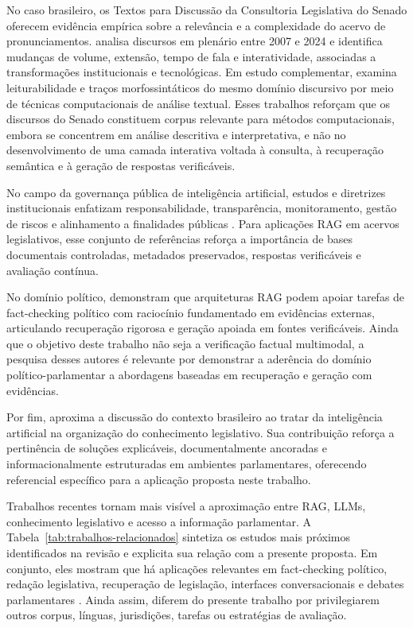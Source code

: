No caso brasileiro, os Textos para Discussão da Consultoria Legislativa do Senado oferecem evidência empírica sobre a relevância e a complexidade do acervo de pronunciamentos. \textcite{blanco2025plenarioPalanqueEstudio} analisa discursos em plenário entre 2007 e 2024 e identifica mudanças de volume, extensão, tempo de fala e interatividade, associadas a transformações institucionais e tecnológicas. Em estudo complementar, \textcite{blanco2026letrasGraudas} examina leiturabilidade e traços morfossintáticos do mesmo domínio discursivo por meio de técnicas computacionais de análise textual. Esses trabalhos reforçam que os discursos do Senado constituem corpus relevante para métodos computacionais, embora se concentrem em análise descritiva e interpretativa, e não no desenvolvimento de uma camada interativa voltada à consulta, à recuperação semântica e à geração de respostas verificáveis.

No campo da governança pública de inteligência artificial, estudos e diretrizes institucionais enfatizam responsabilidade, transparência, monitoramento, gestão de riscos e alinhamento a finalidades públicas \parencite{deAlmeidaSantos2025aiGovernance,ipu2024aiParliaments,wfd2023guidelinesAiParliaments}. Para aplicações RAG em acervos legislativos, esse conjunto de referências reforça a importância de bases documentais controladas, metadados preservados, respostas verificáveis e avaliação contínua.

No domínio político, \textcite{khaliq2024ragar} demonstram que arquiteturas RAG podem apoiar tarefas de fact-checking político com raciocínio fundamentado em evidências externas, articulando recuperação rigorosa e geração apoiada em fontes verificáveis. Ainda que o objetivo deste trabalho não seja a verificação factual multimodal, a pesquisa desses autores é relevante por demonstrar a aderência do domínio político-parlamentar a abordagens baseadas em recuperação e geração com evidências.

Por fim, \textcite{martelloteViola2025organizacaoConhecimento} aproxima a discussão do contexto brasileiro ao tratar da inteligência artificial na organização do conhecimento legislativo. Sua contribuição reforça a pertinência de soluções explicáveis, documentalmente ancoradas e informacionalmente estruturadas em ambientes parlamentares, oferecendo referencial específico para a aplicação proposta neste trabalho.

Trabalhos recentes tornam mais visível a aproximação entre RAG, LLMs, conhecimento legislativo e acesso a informação parlamentar. A Tabela~\ref{tab:trabalhos-relacionados} sintetiza os estudos mais próximos identificados na revisão e explicita sua relação com a presente proposta. Em conjunto, eles mostram que há aplicações relevantes em fact-checking político, redação legislativa, recuperação de legislação, interfaces conversacionais e debates parlamentares \parencite{khaliq2024ragar,chouhanGertz2024lexdrafter,rogiersEtAl2024kamerraad,matoshiEtAl2025parliamentRag,garrisonEtAl2024talkNdaa,colomboEtAl2025legisSearch,mosbachEtAl2025worldAvatarParliament,sarnikar2025legislativeTexts}. Ainda assim, diferem do presente trabalho por privilegiarem outros corpus, línguas, jurisdições, tarefas ou estratégias de avaliação.

